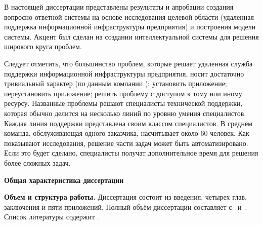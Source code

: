 В настоящей диссертации представлены результаты и апробации создания вопросно-ответной системы на основе исследования целевой области (удаленная поддержка информационной инфраструктуры предприятия) и построения модели системы. Акцент был сделан на создании интеллектуальной системы для решения широкого круга проблем. \par

Следует отметить, что большинство проблем, которые решает удаленная служба поддержки информационной инфраструктуры предприятия, носит достаточно тривиальный характер (по данным компании \icl): установить приложение; переустановить приложение; решить проблему с доступом к тому или иному ресурсу.
Названные проблемы решают специалисты технической поддержки, которая обычно делится на несколько линий по уровню умения специалистов. Каждая линия поддержки представлена своим классом специалистов. В среднем команда, обслуживающая одного заказчика, насчитывает около 60 человек. Как показывают исследования, решение части задач может быть автоматизировано. Если это будет сделано,  специалисты получат дополнительное время для решения более сложных задач. \par


\textbf{Общая характеристика диссертации} 
\newcommand{\actuality}{\underline{\textbf{Актуальность темы.}}}
\newcommand{\aim}{{\textbf{Целью}}}
\newcommand{\tasks}{{\textbf{задачи}}}
\newcommand{\scope}{{\textbf{Область исследования}}}
\newcommand{\subject}{{\textbf{Предметом исследования}}}
\newcommand{\methods}{{\textbf{Методы исследования}}}
\newcommand{\defpositions}{{\textbf{Основные положения, выносимые на~защиту:}}}
\newcommand{\novelty}{{\textbf{Научная новизна}}}
\newcommand{\influence}{{\textbf{Практическая значимость.}}}
\newcommand{\reliability}{{\textbf{Достоверность}}}
\newcommand{\probation}{{\textbf{Апробация работы.}}}
\newcommand{\contribution}{{\textbf{Личный вклад.}}}
\newcommand{\publications}{{\textbf{Публикации.}}}


\textbf{Объем и структура работы.} Диссертация состоит из введения, четырех глав, заключения и пяти приложений. Полный объём диссертации составляет  
с~
и~. Список литературы содержит  
.
\clearpage

